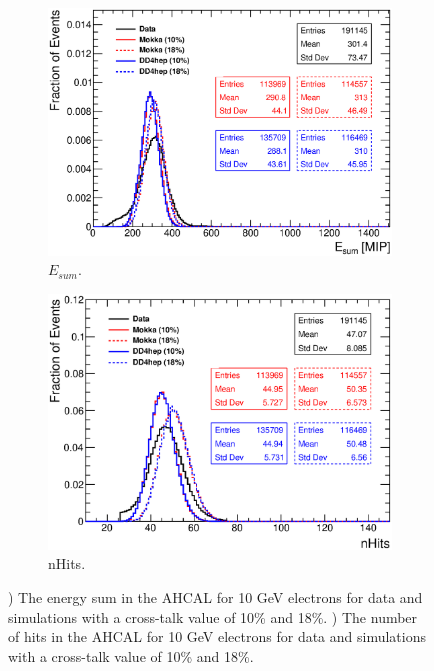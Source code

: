 \begin{figure}[htbp!]
	\centering
	\begin{subfigure}[t]{0.49\textwidth}
		\includegraphics[width=1.\linewidth]{../Thesis_Plots/Validation/Plots/Comparison_EnergySum_Xtalk_electrons10GeV.eps}
		\caption{$E_{sum}$.} \label{fig:e10Evis}
	\end{subfigure}
	\hfill
	\begin{subfigure}[t]{0.49\textwidth}
		\includegraphics[width=1.\linewidth]{../Thesis_Plots/Validation/Plots/Comparison_nHits_Xtalk_electrons10GeV.eps}
		\caption{nHits.} \label{fig:e10nHits}
	\end{subfigure}
	\caption{) The energy sum in the AHCAL for 10 GeV electrons for data and simulations with a cross-talk value of 10\% and 18\%. ) The number of hits in the AHCAL for 10 GeV electrons for data and simulations with a cross-talk value of 10\% and 18\%.}
	\label{fig:e10Val}
\end{figure}

